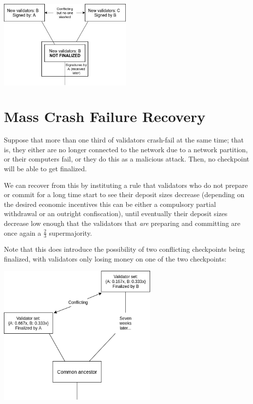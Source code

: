 \documentclass[12pt]{article}
\begin{document}
\includegraphics[width=250px]{validator_set_misalignment.png}

\section{Mass Crash Failure Recovery}

Suppose that more than one third of validators crash-fail at the same time; that is, they either are no longer connected to the network due to a network partition, or their computers fail, or they do this as a malicious attack. Then, no checkpoint will be able to get finalized.

We can recover from this by instituting a rule that validators who do not prepare or commit for a long time start to see their deposit sizes decrease (depending on the desired economic incentives this can be either a compulsory partial withdrawal or an outright confiscation), until eventually their deposit sizes decrease low enough that the validators that \textit{are} preparing and committing are once again a $\frac{2}{3}$ supermajority.

Note that this does introduce the possibility of two conflicting checkpoints being finalized, with validators only losing money on one of the two checkpoints:

\includegraphics[width=300px]{CommitsSync.png}
\end{document}
